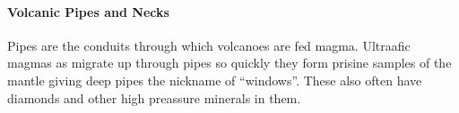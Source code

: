 \documentclass{article}
\begin{document}
\paragraph{Volcanic Pipes and Necks} %
\label{par:volcanic_pipes_and_necks}
Pipes are the conduits through which volcanoes are fed magma. Ultraafic magmas as migrate up through pipes so quickly they form prisine samples of the mantle giving deep pipes the nickname of ``windows''. These also often have diamonds and other high preassure minerals in them.









\end{document}
